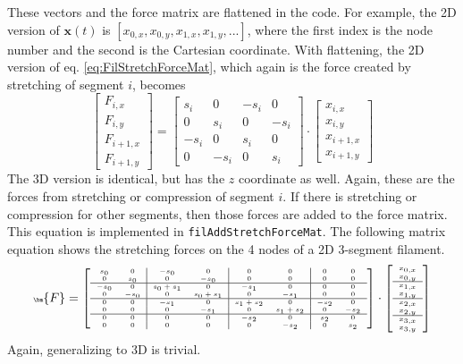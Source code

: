 \documentclass {scrbook}
\newcommand {\ttt} {\texttt}
\begin{document}
These vectors and the force matrix are flattened in the code. For example, the 2D version of $\bm{x}(t)$ is $[x_{0,x}, x_{0,y}, x_{1,x}, x_{1,y}, ...]$, where the first index is the node number and the second is the Cartesian coordinate. With flattening, the 2D version of eq. \ref{eq:FilStretchForceMat}, which again is the force created by stretching of segment $i$, becomes
$$\left[ \begin{array}{c} F_{i,x} \\ F_{i,y} \\ \hline F_{i+1,x} \\ F_{i+1,y} \end{array} \right] = \left[ \begin{array}{cc|cc}
s_i & 0 & -s_i & 0 \\
0 & s_i & 0 & -s_i \\ \hline
-s_i & 0 & s_i & 0 \\
0 & -s_i & 0 & s_i
\end{array} \right] \cdot
\left[ \begin{array}{c}
x_{i,x} \\ x_{i,y} \\ \hline x_{i+1,x} \\ x_{i+1,y}
\end{array} \right]$$
The 3D version is identical, but has the $z$ coordinate as well. Again, these are the forces from stretching or compression of segment $i$. If there is stretching or compression for other segments, then those forces are added to the force matrix. This equation is implemented in \ttt{filAddStretchForceMat}. The following matrix equation shows the stretching forces on the 4 nodes of a 2D 3-segment filament.
$$\tiny
\bm{F} = \left[ \begin{array}{cc|cc|cc|cc}
s_0 & 0 & -s_0 & 0 & 0 & 0 & 0 & 0 \\
0 & s_0 & 0 & -s_0 & 0 & 0 & 0 & 0 \\ \hline
-s_0 & 0 & s_0+s_1 & 0 & -s_1 & 0 & 0 & 0 \\
0 & -s_0 & 0 & s_0+s_1 & 0 & -s_1 & 0 & 0 \\ \hline
0 & 0 & -s_1 & 0 & s_1+s_2 & 0 & -s_2 & 0 \\
0 & 0 & 0 & -s_1 & 0 & s_1+s_2 & 0 & -s_2 \\ \hline
0 & 0 & 0 & 0 & -s_2 & 0 & s_2 & 0 \\
0 & 0 & 0 & 0 & 0 & -s_2 & 0 & s_2
\end{array} \right] \cdot
\left[ \begin{array}{c}
x_{0,x} \\ x_{0,y} \\ \hline x_{1,x} \\ x_{1,y} \\ \hline x_{2,x} \\ x_{2,y} \\ \hline x_{3,x} \\ x_{3,y}
\end{array} \right]
$$
Again, generalizing to 3D is trivial.
\end{document}

